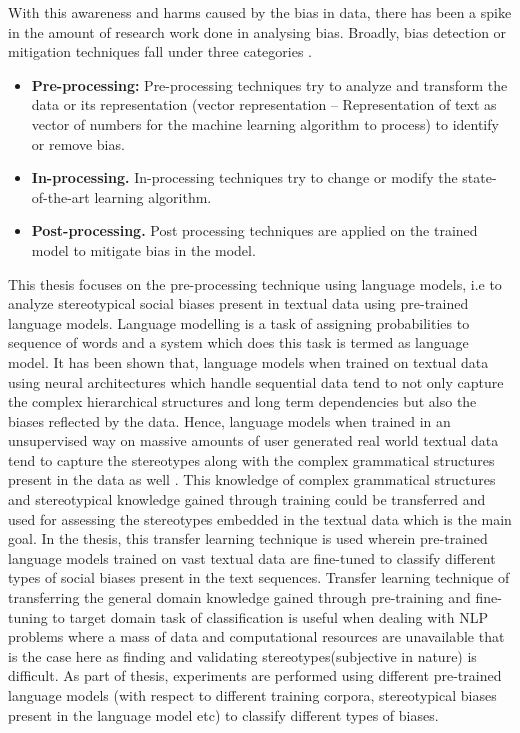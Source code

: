 With this awareness and harms caused by the bias in data, there has been a spike in the amount of research work done in analysing bias.
Broadly, bias detection or mitigation techniques fall under three categories \cite{mehrabi2019survey}.
\begin{itemize}
    \item \textbf{Pre-processing:} Pre-processing techniques try to analyze and transform the data or its representation (vector representation – Representation of text as vector of numbers for the machine learning algorithm to process) to identify or remove bias.
    \item \textbf{In-processing.} In-processing techniques try to change or modify the state-of-the-art learning algorithm.
    \item  \textbf{Post-processing.} Post processing techniques are applied on the trained model to mitigate bias in the model.
\end{itemize}   
This thesis focuses on the pre-processing technique using language models, i.e to analyze stereotypical social biases present in textual data using pre-trained language models. Language modelling is
a task of assigning probabilities to sequence of words and a system which does this task is termed as language model\cite{DNLP}. It has been shown that, language
models when trained on textual data using neural architectures which handle sequential data tend to not only capture the complex hierarchical structures and long term dependencies 
but also the biases reflected by the data. Hence,
language models when trained in an unsupervised way on massive amounts of user generated real world textual data tend to capture the stereotypes along with the complex grammatical structures present in the data as well \cite{nadeem2020stereoset}\cite{ruder2019neural}\cite{brown2020language}. This knowledge of complex grammatical structures and stereotypical knowledge gained through training could be transferred and used for assessing the stereotypes embedded in the textual data which is the main goal. In the thesis, this transfer learning technique is used wherein pre-trained language models trained on vast textual data are fine-tuned to classify different types of social biases present in the text sequences. Transfer learning technique of transferring
the general domain knowledge gained through pre-training and fine-tuning to target domain task of classification is useful when dealing with NLP problems where a mass of data and computational resources are unavailable \cite{transfer_Learning} that is the case here as finding and validating stereotypes(subjective in nature) is difficult. As part of thesis, experiments are performed using different pre-trained language models (with respect to different training corpora, stereotypical biases present in the language model etc) to classify different types of biases.
\\

